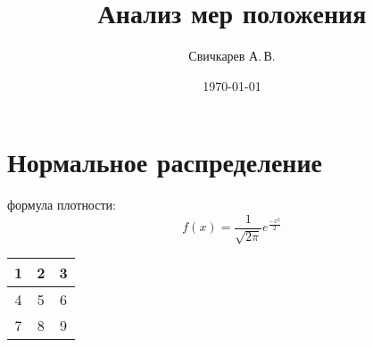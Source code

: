\documentclass{article} %
\title{Анализ мер положения} %
\author{Свичкарев А.\,В.} %
\date{\today} %
\begin{document}

\maketitle %

\section{Нормальное распределение}

формула плотности:
\[ f(x) = \frac{1}{\sqrt{ 2\pi }}e^{\frac{-x^2}{2}} \]

\begin{center}
	\begin{tabular}{|c|c|c|} \hline
		1 & 2 & 3 \\ \hline
		4 & 5 & 6 \\ \hline
		7 & 8 & 9 \\ \hline
	\end{tabular}
\end{center}
\end{document}
